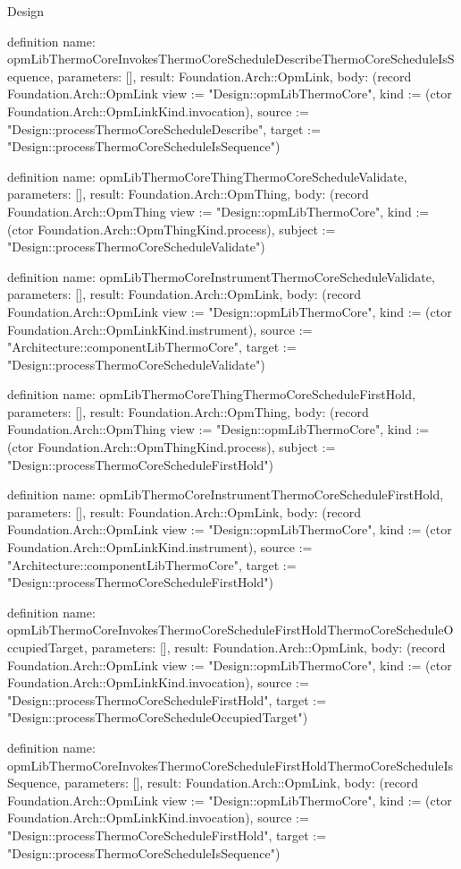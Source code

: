 \begin{lexlean}{Design}
\begin{semanticmodule}
definition{
  name: opmLibThermoCoreInvokesThermoCoreScheduleDescribeThermoCoreScheduleIsSequence,
  parameters: [],
  result: Foundation.Arch::OpmLink,
  body: (record Foundation.Arch::OpmLink {view := "Design::opmLibThermoCore", kind := (ctor Foundation.Arch::OpmLinkKind.invocation), source := "Design::processThermoCoreScheduleDescribe", target := "Design::processThermoCoreScheduleIsSequence"})
}

definition{
  name: opmLibThermoCoreThingThermoCoreScheduleValidate,
  parameters: [],
  result: Foundation.Arch::OpmThing,
  body: (record Foundation.Arch::OpmThing {view := "Design::opmLibThermoCore", kind := (ctor Foundation.Arch::OpmThingKind.process), subject := "Design::processThermoCoreScheduleValidate"})
}

definition{
  name: opmLibThermoCoreInstrumentThermoCoreScheduleValidate,
  parameters: [],
  result: Foundation.Arch::OpmLink,
  body: (record Foundation.Arch::OpmLink {view := "Design::opmLibThermoCore", kind := (ctor Foundation.Arch::OpmLinkKind.instrument), source := "Architecture::componentLibThermoCore", target := "Design::processThermoCoreScheduleValidate"})
}

definition{
  name: opmLibThermoCoreThingThermoCoreScheduleFirstHold,
  parameters: [],
  result: Foundation.Arch::OpmThing,
  body: (record Foundation.Arch::OpmThing {view := "Design::opmLibThermoCore", kind := (ctor Foundation.Arch::OpmThingKind.process), subject := "Design::processThermoCoreScheduleFirstHold"})
}

definition{
  name: opmLibThermoCoreInstrumentThermoCoreScheduleFirstHold,
  parameters: [],
  result: Foundation.Arch::OpmLink,
  body: (record Foundation.Arch::OpmLink {view := "Design::opmLibThermoCore", kind := (ctor Foundation.Arch::OpmLinkKind.instrument), source := "Architecture::componentLibThermoCore", target := "Design::processThermoCoreScheduleFirstHold"})
}

definition{
  name: opmLibThermoCoreInvokesThermoCoreScheduleFirstHoldThermoCoreScheduleOccupiedTarget,
  parameters: [],
  result: Foundation.Arch::OpmLink,
  body: (record Foundation.Arch::OpmLink {view := "Design::opmLibThermoCore", kind := (ctor Foundation.Arch::OpmLinkKind.invocation), source := "Design::processThermoCoreScheduleFirstHold", target := "Design::processThermoCoreScheduleOccupiedTarget"})
}

definition{
  name: opmLibThermoCoreInvokesThermoCoreScheduleFirstHoldThermoCoreScheduleIsSequence,
  parameters: [],
  result: Foundation.Arch::OpmLink,
  body: (record Foundation.Arch::OpmLink {view := "Design::opmLibThermoCore", kind := (ctor Foundation.Arch::OpmLinkKind.invocation), source := "Design::processThermoCoreScheduleFirstHold", target := "Design::processThermoCoreScheduleIsSequence"})
}


\end{semanticmodule}
\end{lexlean}
